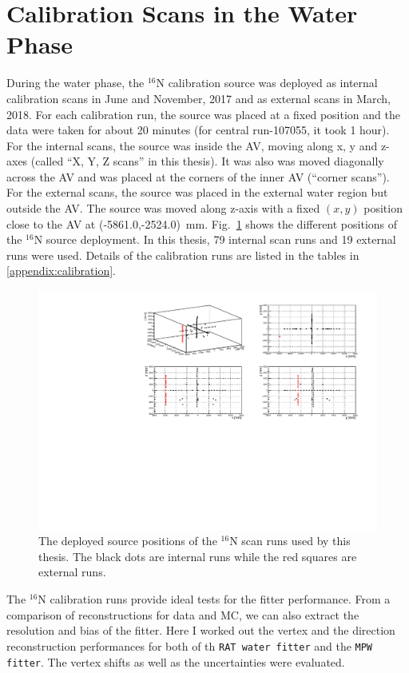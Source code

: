 \section{ Calibration Scans in the Water Phase}\label{sect:n16_water}
During the water phase, the $^{16}$N calibration source was deployed as internal calibration scans in June and November, 2017 and as external scans in March, 2018. For each calibration run, the source was placed at a fixed position and the data were taken for about 20 minutes (for central run-107055, it took 1 hour). For the internal scans, the source was inside the AV, moving along x, y and z-axes (called ``X, Y, Z scans'' in this thesis). It was also was moved diagonally across the AV and was placed at the corners of the inner AV (``corner scans''). For the external scans, the source was placed in the external water region but outside the AV. The source was moved along z-axis with a fixed $(x,y)$ position close to the AV at (-5861.0,-2524.0)~mm. Fig.~\ref{N16_3Dscan} shows the different positions of the $^{16}$N source deployment. In this thesis, 79 internal scan runs and 19 external runs were used. Details of the calibration runs are listed in the tables in \ref{appendix:calibration}. 

\begin{figure}[!htb]
	\centering
	\includegraphics[width=15cm]{N16_3Dscan.pdf}
	\caption{The deployed source positions of the $^{16}$N scan runs used by this thesis. The black dots are internal runs while the red squares are external runs.}
	\label{N16_3Dscan}
\end{figure}

The $^{16}$N calibration runs provide ideal tests for the fitter performance. From a comparison of reconstructions for data and MC, we can also extract the resolution and bias of the fitter. Here I worked out the vertex and the direction reconstruction performances for both of th \texttt{RAT water fitter} and the \texttt{MPW fitter}. The vertex shifts as well as the uncertainties were evaluated. 

